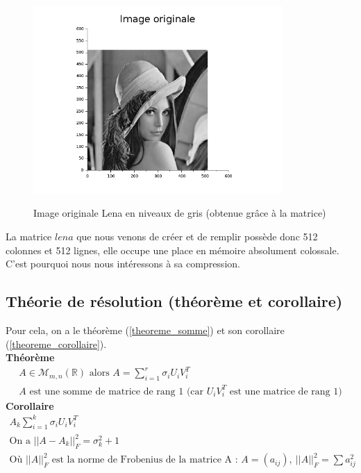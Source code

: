 \documentclass[a4paper,10pt]{report}
\begin{document}
\begin{figure}[H]
\centering
\caption{Image originale Lena en niveaux de gris (obtenue grâce à la matrice)}
\includegraphics[width=9.5cm]{lena_originale.png}
\label{originale}
\end{figure}

La matrice $lena$ que nous venons de créer et de remplir possède donc 512 colonnes et 512 lignes, elle occupe une place en mémoire absolument colossale. C'est pourquoi nous nous intéressons à sa compression.

\subsection{Théorie de résolution (théorème et corollaire)}
Pour cela, on a le théorème (\ref{theoreme_somme}) et son corollaire (\ref{theoreme_corollaire}).\\
\indent \textbf{Théorème}\\
\begin{equation}
\label{theoreme_somme}
\begin{array}{l}
A \in \mathcal{M}_{m,n}(\mathbb{R}) \text{ alors } A=\sum \limits_{i=1}^r \sigma_i U_i V_i^T \\
A \text{ est une somme de matrice de rang 1 (car } U_i V_i^T \text{ est une matrice de rang 1)}
\end{array}
\end{equation}
\indent \textbf{Corollaire}\\
\begin{equation}
\label{theoreme_corollaire}
\begin{array}{l}
A_k \sum \limits_{i=1}^k \sigma_i U_i V_i^T \\
\text{On a } ||A-A_k||^2_F= \sigma^2_k+1\\
\text{Où } ||A||^2_F \text{ est la norme de Frobenius de la matrice A : } A=(a_{ij}), \ ||A||^2_F=\sum a_{ij}^2
\end{array}
\end{equation} \\
\end{document}

